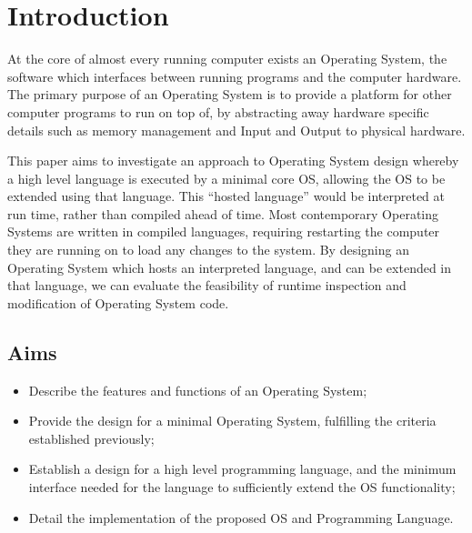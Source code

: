 \documentclass[10pt]{report}
\begin{document}
\tableofcontents
\newpage

\chapter{Introduction}
At the core of almost every running computer exists an Operating System, the software which interfaces between running programs and the computer hardware. The primary purpose of an Operating System is to provide a platform for other computer programs to run on top of, by abstracting away hardware specific details such as memory management and Input and Output to physical hardware.

This paper aims to investigate an approach to Operating System design whereby a high level language is executed by a minimal core OS, allowing the OS to be extended using that language. This ``hosted language'' would be interpreted at run time, rather than compiled ahead of time. Most contemporary Operating Systems are written in compiled languages, requiring restarting the computer they are running on to load any changes to the system. By designing an Operating System which hosts an interpreted language, and can be extended in that language, we can evaluate the feasibility of runtime inspection and modification of Operating System code.

\section{Aims}
\begin{itemize}
\item Describe the features and functions of an Operating System;
\item Provide the design for a minimal Operating System, fulfilling the criteria established previously;
\item Establish a design for a high level programming language, and the minimum interface needed for the language to sufficiently extend the OS functionality;
\item Detail the implementation of the proposed OS and Programming Language.
\end{itemize}
\end{document}
